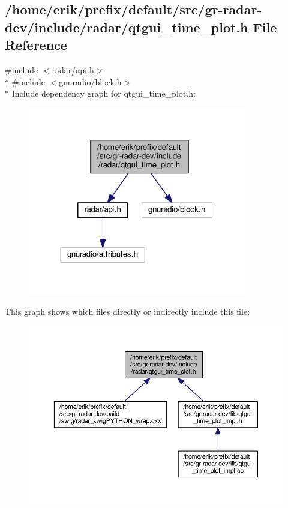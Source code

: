\subsection{/home/erik/prefix/default/src/gr-\/radar-\/dev/include/radar/qtgui\+\_\+time\+\_\+plot.h File Reference}
\label{qtgui__time__plot_8h}
{\ttfamily \#include $<$radar/api.\+h$>$}\\*
{\ttfamily \#include $<$gnuradio/block.\+h$>$}\\*
Include dependency graph for qtgui\+\_\+time\+\_\+plot.\+h\+:
\nopagebreak
\begin{figure}[H]
\begin{center}
\leavevmode
\includegraphics[width=270pt]{df/d57/qtgui__time__plot_8h__incl}
\end{center}
\end{figure}
This graph shows which files directly or indirectly include this file\+:
\nopagebreak
\begin{figure}[H]
\begin{center}
\leavevmode
\includegraphics[width=350pt]{d1/d80/qtgui__time__plot_8h__dep__incl}
\end{center}
\end{figure}
